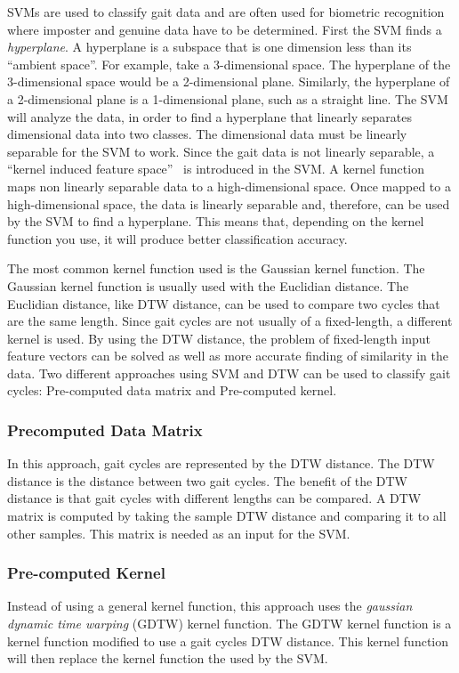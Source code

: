 \documentclass{sig-alternate}
\begin{document}
	SVMs are used to classify gait data and are often used for biometric recognition where imposter and genuine data have to be determined. First the SVM finds a \textit{hyperplane}. A hyperplane is a subspace that is one dimension less than its ``ambient space''. For example, take a 3-dimensional space. The hyperplane of the 3-dimensional space would be a 2-dimensional plane. Similarly, the hyperplane of a 2-dimensional plane is a 1-dimensional plane, such as a straight line. The SVM will analyze the data, in order to find a hyperplane that linearly separates dimensional data into two classes. The dimensional data must be linearly separable for the SVM to work. Since the gait data is not linearly separable, a ``kernel induced feature space''~\cite{Muaaz:2013} is introduced in the SVM. A kernel function maps non linearly separable data to a high-dimensional space. Once mapped to a high-dimensional space, the data is linearly separable and, therefore, can be used by the SVM to find a hyperplane. This means that, depending on the kernel function you use, it will produce better classification accuracy. 

The most common kernel function used is the Gaussian kernel function. The Gaussian kernel function is usually used with the Euclidian distance. The Euclidian distance, like DTW distance, can be used to compare two cycles that are the same length. Since gait cycles are not usually of a fixed-length, a different kernel is used. By using the DTW distance, the problem of fixed-length input feature vectors can be solved as well as more accurate finding of similarity in the data. Two different approaches using SVM and DTW can be used to classify gait cycles: Pre-computed data matrix and Pre-computed kernel.

\subsubsection*{Precomputed Data Matrix}
	In this approach, gait cycles are represented by the DTW distance. The DTW distance is the distance between two gait cycles. The benefit of the DTW distance is that gait cycles with different lengths can be compared. A DTW matrix is computed by taking the sample DTW distance and comparing it to all other samples. This matrix is needed as an input for the SVM.	

\subsubsection*{Pre-computed Kernel}
Instead of using a general kernel function, this approach uses the \textit{gaussian dynamic time warping} (GDTW) kernel function. The GDTW kernel function is a kernel function modified to use a gait cycles DTW distance. This kernel function will then replace the kernel function the used by the SVM.  
\end{document}

